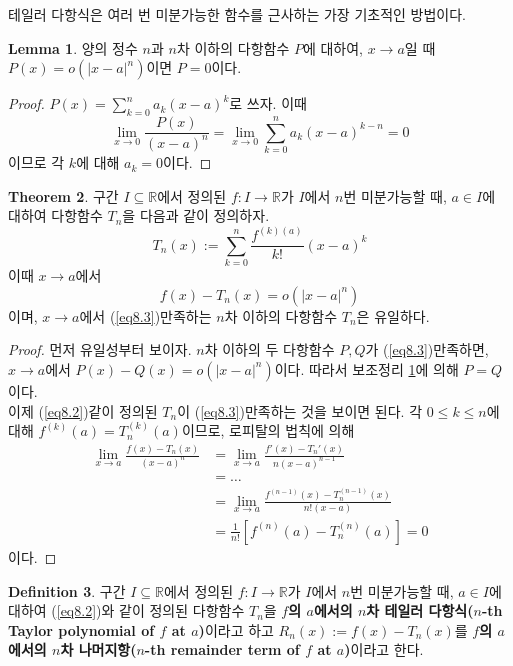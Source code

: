 \documentclass[11pt]{book}
\numberwithin{equation}{chapter}
\def\RR{\mathbb{R}}
\newcommand{\abs}[1]{\left\vert#1\right\vert}
\theoremstyle{definition}
\newtheorem{thm}{Theorem}[section]
\newtheorem{lem}[thm]{Lemma}
\newtheorem{defn}[thm]{Definition}
\begin{document}
테일러 다항식은 여러 번 미분가능한 함수를 근사하는 가장 기초적인 방법이다.

\begin{lem} \label{lem 8.3.1}
    양의 정수 \(n\)과 \(n\)차 이하의 다항함수 \(P\)에 대하여, \(x \to a\)일 때 \(P(x) = o(\abs{x - a}^n)\)이면 \(P = 0\)이다.
\end{lem}
\begin{proof}
    \(P(x) = \sum_{k=0}^n a_k (x-a)^k\)로 쓰자. 이때
    \[
    \lim_{x \to 0} \frac{P(x)}{(x-a)^n} = \lim_{x \to 0} \sum_{k=0}^n a_k (x-a)^{k-n} = 0    
    \]
    이므로 각 \(k\)에 대해 \(a_k = 0\)이다.
\end{proof}

\begin{thm}
    구간 \(I \subseteq \RR\)에서 정의된 \(f : I \to \RR\)가 \(I\)에서 \(n\)번 미분가능할 때, \(a \in I\)에 대하여 다항함수 \(T_n\)을 다음과 같이 정의하자.
    \begin{equation} \label{eq8.2}
        T_n(x) := \sum_{k=0}^n \frac{f^{(k)(a)}}{k!} (x - a)^k
    \end{equation}
    이때 \(x \to a\)에서
    \begin{equation}\label{eq8.3}
        f(x) - T_n(x) = o(\abs{x-a}^n)
    \end{equation}
    이며, \(x \to a\)에서 (\ref{eq8.3})\를 만족하는 \(n\)차 이하의 다항함수 \(T_n\)은 유일하다.
\end{thm}
\begin{proof}
    먼저 유일성부터 보이자. \(n\)차 이하의 두 다항함수 \(P, Q\)가 (\ref{eq8.3})\를 만족하면, \(x \to a\)에서 \(P(x) - Q(x) = o(\abs{x-a}^n)\)이다. 따라서 보조정리 \ref{lem 8.3.1}에 의해 \(P = Q\)이다.\\
    이제 (\ref{eq8.2})\와 같이 정의된 \(T_n\)이 (\ref{eq8.3})\를 만족하는 것을 보이면 된다. 각 \(0 \le k \le n\)에 대해 \(f^{(k)}(a) = T_n^{(k)}(a)\)이므로, 로피탈의 법칙에 의해
    \begin{align*}
        \lim_{x \to a} \frac{f(x) - T_n(x)}{(x - a)^n} &= \lim_{x \to a} \frac{f'(x) - T_n'(x)}{n(x-a)^{n-1}}\\
        &= \ldots\\
        &= \lim_{x \to a} \frac{f^{(n-1)}(x) - T_n^{(n-1)}(x)}{n!(x-a)}\\
        &= \frac{1}{n!}[f^{(n)}(a) - T_n^{(n)}(a)] = 0
    \end{align*}
    이다.
\end{proof}

\begin{defn}
    구간 \(I \subseteq \RR\)에서 정의된 \(f : I \to \RR\)가 \(I\)에서 \(n\)번 미분가능할 때, \(a \in I\)에 대하여 (\ref{eq8.2})와 같이 정의된 다항함수 \(T_n\)을 \textbf{\(f\)의 \(a\)에서의 \(n\)차 테일러 다항식(\(n\)-th Taylor polynomial of \(f\) at \(a\))}이라고 하고 \(R_n(x) := f(x) - T_n(x)\)를 \textbf{\(f\)의 \(a\)에서의 \(n\)차 나머지항(\(n\)-th remainder term of \(f\) at \(a\))}이라고 한다.
\end{defn}
\end{document}
